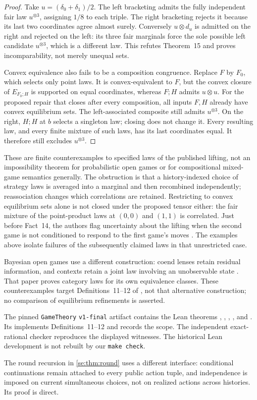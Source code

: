 \begin{proof}
Take $u=(\delta_0+\delta_1)/2$. The left bracketing admits the fully
independent fair law $u^{\otimes3}$, assigning $1/8$ to each triple.
The right bracketing rejects it because its last two coordinates agree
almost surely. Conversely $u\otimes d_u$ is admitted on the right and
rejected on the left: its three fair marginals force the sole possible
left candidate $u^{\otimes3}$, which is a different law. This refutes
Theorem~15 and proves incomparability, not merely unequal sets.

Convex equivalence also fails to be a composition congruence. Replace
$F$ by $F_0$, which selects only point laws. It is convex-equivalent
to $F$, but the convex closure of $E_{F_0;H}$ is supported on equal
coordinates, whereas $F;H$ admits $u\otimes u$. For the proposed
repair that closes after every composition, all inputs $F,H$ already
have convex equilibrium sets. The left-associated composite still admits
$u^{\otimes3}$. On the right, $H;H$ at $b$ selects a singleton law;
closing does not change it. Every resulting law, and every finite
mixture of such laws, has its last coordinates equal. It therefore
still excludes $u^{\otimes3}$.
\end{proof}

These are finite counterexamples to specified laws of the published
lifting, not an impossibility theorem for probabilistic open games or
for compositional mixed-game semantics generally. The obstruction is
that a history-indexed choice of strategy laws is averaged into a
marginal and then recombined independently; reassociation changes
which correlations are retained. Restricting to convex equilibrium
sets alone is not closed under the proposed tensor either: the fair
mixture of the point-product laws at $(0,0)$ and $(1,1)$ is correlated.
Just before Fact~14, the authors flag uncertainty about the lifting when
the second game is not conditioned to respond to the first game's moves
\cite{GhaniEtAl2020}. The examples above isolate failures of the
subsequently claimed laws in that unrestricted case.

Bayesian open games use a different construction: coend lenses retain
residual information, and contexts retain a joint law involving an
unobservable state \cite[Sections~3.3--3.10 and 4]{BoltHedgesZahn2023}.
That paper proves category laws for its own equivalence classes. These
counterexamples target Definitions~11--12 of \cite{GhaniEtAl2020}, not
that alternative construction; no comparison of equilibrium refinements
is asserted.

The pinned \texttt{GameTheory} \texttt{v1-final} artifact
\cite{GameTheoryOpenGameObstructions2026} contains the Lean theorems
,
,
,
, and
. Its  implements
Definitions~11--12 and records the scope. The independent exact-rational
checker  reproduces the
displayed witnesses. The historical Lean development is not rebuilt
by our \texttt{make check}.

The round recursion in \cref{se:thm:round} uses a different interface:
conditional continuations remain attached to every public action tuple,
and independence is imposed on current simultaneous choices, not on
realized actions across histories. Its proof is direct.
